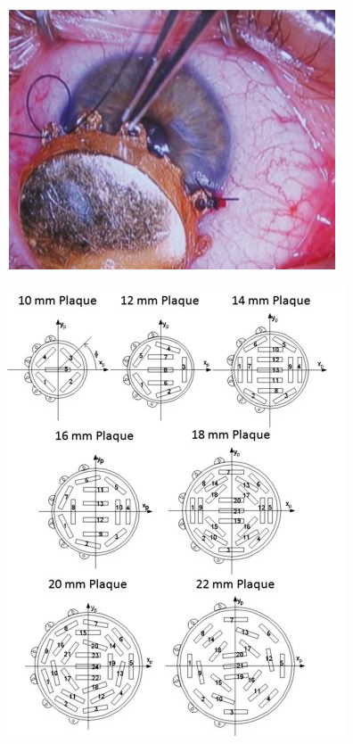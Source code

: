 \documentclass[11pt,a4paper]{article}
\begin{document}
 \includegraphics{Imagens/placaComsOuroMC.JPG}

 \includegraphics{Imagens/placasComs.JPG}
\end{document}
